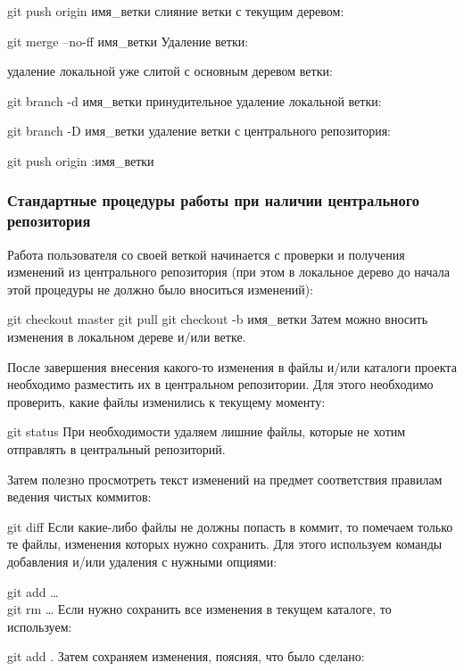 \documentclass[
  english,
  russian,
  12pt,
  a4paper,
  DIV=11,
  numbers=noendperiod]{scrreprt}
\begin{document}
git push origin имя\_ветки слияние ветки с текущим деревом:

git merge --no-ff имя\_ветки Удаление ветки:

удаление локальной уже слитой с основным деревом ветки:

git branch -d имя\_ветки принудительное удаление локальной ветки:

git branch -D имя\_ветки удаление ветки с центрального репозитория:

git push origin :имя\_ветки

\subsubsection{Стандартные процедуры работы при наличии центрального
репозитория}\label{ux441ux442ux430ux43dux434ux430ux440ux442ux43dux44bux435-ux43fux440ux43eux446ux435ux434ux443ux440ux44b-ux440ux430ux431ux43eux442ux44b-ux43fux440ux438-ux43dux430ux43bux438ux447ux438ux438-ux446ux435ux43dux442ux440ux430ux43bux44cux43dux43eux433ux43e-ux440ux435ux43fux43eux437ux438ux442ux43eux440ux438ux44f}

Работа пользователя со своей веткой начинается с проверки и получения
изменений из центрального репозитория (при этом в локальное дерево до
начала этой процедуры не должно было вноситься изменений):

git checkout master git pull git checkout -b имя\_ветки Затем можно
вносить изменения в локальном дереве и/или ветке.

После завершения внесения какого-то изменения в файлы и/или каталоги
проекта необходимо разместить их в центральном репозитории. Для этого
необходимо проверить, какие файлы изменились к текущему моменту:

git status При необходимости удаляем лишние файлы, которые не хотим
отправлять в центральный репозиторий.

Затем полезно просмотреть текст изменений на предмет соответствия
правилам ведения чистых коммитов:

git diff Если какие-либо файлы не должны попасть в коммит, то помечаем
только те файлы, изменения которых нужно сохранить. Для этого используем
команды добавления и/или удаления с нужными опциями:

git add \ldots{}\\
git rm \ldots{} Если нужно сохранить все изменения в текущем каталоге,
то используем:

git add . Затем сохраняем изменения, поясняя, что было сделано:
\end{document}
